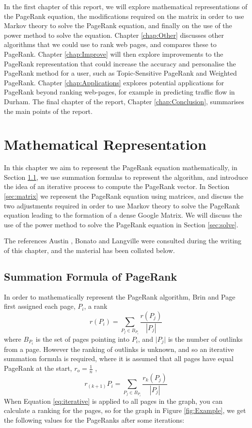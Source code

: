 \documentclass[11pt]{report}
\begin{document}
In the first chapter of this report, we will explore mathematical representations of the PageRank equation, the modifications required on the matrix in order to use Markov theory to solve the PageRank equation, and finally on the use of the power method to solve the equation. Chapter \ref{chap:Other} discusses other algorithms that we could use to rank web pages, and compares these to PageRank. Chapter \ref{chap:Improve} will then explore improvements to the PageRank representation that could increase the accuracy and personalise the PageRank method for a user, such as Topic-Sensitive PageRank and Weighted PageRank. Chapter \ref{chap:Applications} explores potential applications for PageRank beyond ranking web-pages, for example in predicting traffic flow in Durham. The final chapter of the report, Chapter \ref{chap:Conclusion}, summarises the main points of the report.

\chapter{Mathematical Representation} \label{chap:Math}
In this chapter we aim to represent the PageRank equation mathematically, in Section \ref{sec:summ}, we use summation formulas to represent the algorithm, and introduce the idea of an iterative process to compute the PageRank vector. In Section \ref{sec:matrix} we represent the PageRank equation using matrices, and discuss the two adjustments required in order to use Markov theory to solve the PageRank equation leading to the formation of a dense Google Matrix. We will discuss the use of the power method to solve the PageRank equation in Section \ref{sec:solve}.

The references Austin \cite{austin}, Bonato \cite{bonato} and Langville \cite{langville} were consulted during the writing of this chapter, and the material has been collated below.  
\section{Summation Formula of PageRank} \label{sec:summ}
In order to mathematically represent the PageRank algorithm, Brin and Page first assigned each page, $P_i$, a rank
\[ r(P_i) = \displaystyle \sum_{P_j\in B_{P_i }} \frac{r(P_j)}{|P_j|} \]
where $B_{P_i}$ is the set of pages pointing into $P_i$, and $\vert P_j\vert$ is the number of outlinks from a page. However the ranking of outlinks is unknown, and so an iterative summation formula is required, where it is assumed that all pages have equal PageRank at the start, \(r_o = \frac{1}{n}\) , 
\begin{equation} \label{eq:iterative}
r_{(k+1)}P_i = \displaystyle \sum_{P_j\in B_{P_i }}\frac{r_k(P_j)}{|P_j|}
\end{equation} 
When Equation \eqref{eq:iterative} is applied to all pages in the graph, you can calculate a ranking for the pages, so for the graph in Figure \ref{fig:Example}, we get the following values for the PageRanks after some iterations: 
\end{document}
